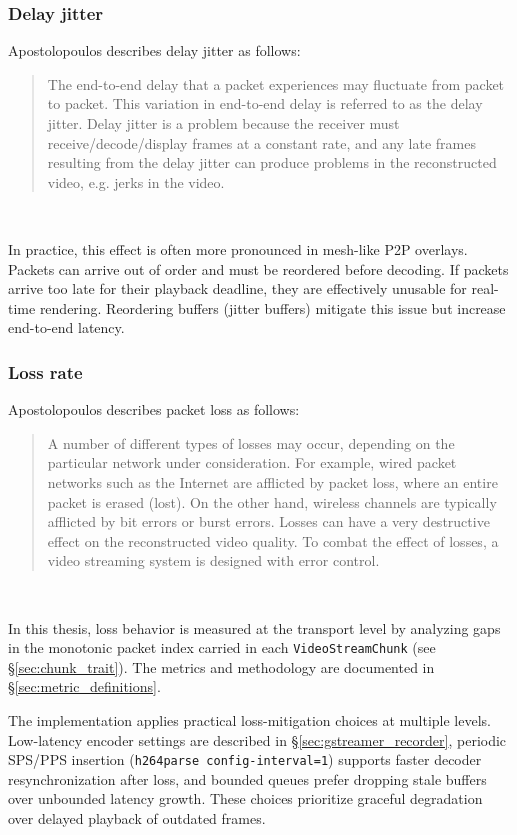 \subsubsection{Delay jitter}
\label{sec:delay_jitter}
Apostolopoulos describes delay jitter as follows:
\begin{quote}
The end-to-end delay that a packet experiences may fluctuate from packet to
packet. This variation in end-to-end delay is referred to as the delay jitter.
Delay jitter is a problem because the receiver must receive/decode/display
frames at a constant rate, and any late frames resulting from the delay jitter
can produce problems in the reconstructed video, e.g. jerks in the video.
\end{quote}~\cite{apostolopoulosVideoStreamingConcepts}

In practice, this effect is often more pronounced in mesh-like \ac{P2P} overlays. Packets can arrive out of order and must be reordered before decoding. If packets arrive too late for their playback deadline, they are effectively unusable for real-time rendering. Reordering buffers (jitter buffers) mitigate this issue but increase end-to-end latency.~\cite{schulzrinne_rtp_2003}

\subsubsection{Loss rate}
Apostolopoulos describes packet loss as follows:
\begin{quote}
A number of different types of
losses may occur, depending on the particular network under consideration.
For example, wired packet networks such as the Internet are afflicted by
packet loss, where an entire packet is erased (lost). On the other hand,
wireless channels are typically afflicted by bit errors or burst errors. Losses
can have a very destructive effect on the reconstructed video quality. To
combat the effect of losses, a video streaming system is designed with error
control.
\end{quote}~\cite{apostolopoulosVideoStreamingConcepts}

In this thesis, loss behavior is measured at the transport level by analyzing gaps in the monotonic packet index carried in each \texttt{VideoStreamChunk} (see \S\ref{sec:chunk_trait}).
The metrics and methodology are documented in \S\ref{sec:metric_definitions}.

The implementation applies practical loss-mitigation choices at multiple levels.
Low-latency encoder settings are described in \S\ref{sec:gstreamer_recorder}, periodic SPS/PPS insertion (\texttt{h264parse config-interval=1}) supports faster decoder resynchronization after loss, and bounded queues prefer dropping stale buffers over unbounded latency growth.
These choices prioritize graceful degradation over delayed playback of outdated frames.

